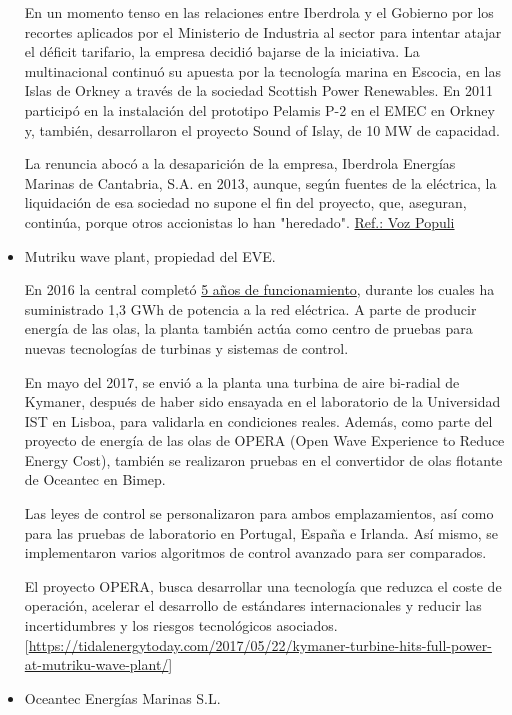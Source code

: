 \documentclass[]{article}
\begin{document}
\begin{itemize}
  En un momento tenso en las relaciones entre Iberdrola y el Gobierno
  por los recortes aplicados por el Ministerio de Industria al sector
  para intentar atajar el déficit tarifario, la empresa decidió bajarse
  de la iniciativa. La multinacional continuó su apuesta por la
  tecnología marina en Escocia, en las Islas de Orkney a través de la
  sociedad Scottish Power Renewables. En 2011 participó en la
  instalación del prototipo Pelamis P-2 en el EMEC en Orkney y, también,
  desarrollaron el proyecto Sound of Islay, de 10 MW de capacidad.

  La renuncia abocó a la desaparición de la empresa, Iberdrola Energías
  Marinas de Cantabria, S.A. en 2013, aunque, según fuentes de la
  eléctrica, la liquidación de esa sociedad no supone el fin del
  proyecto, que, aseguran, continúa, porque otros accionistas lo han
  "heredado".
  \href{https://www.vozpopuli.com/economia-y-finanzas/empresas/Iberdrola-Energia_marina-Cantabria_0_642535793.html}{Ref.:
  Voz Populi}
\item
  Mutriku wave plant, propiedad del EVE.

  En 2016 la central completó
  \href{https://tidalenergytoday.com/2016/07/19/mutriku-wave-plant-generates-over-1gwh-of-clean-power/}{5
  años de funcionamiento}, durante los cuales ha suministrado 1,3 GWh de
  potencia a la red eléctrica. A parte de producir energía de las olas,
  la planta también actúa como centro de pruebas para nuevas tecnologías
  de turbinas y sistemas de control.

  En mayo del 2017, se envió a la planta una turbina de aire bi-radial
  de Kymaner, después de haber sido ensayada en el laboratorio de la
  Universidad IST en Lisboa, para validarla en condiciones reales.
  Además, como parte del proyecto de energía de las olas de OPERA (Open
  Wave Experience to Reduce Energy Cost), también se realizaron pruebas
  en el convertidor de olas flotante de Oceantec en Bimep.

  Las leyes de control se personalizaron para ambos emplazamientos, así
  como para las pruebas de laboratorio en Portugal, España e Irlanda.
  Así mismo, se implementaron varios algoritmos de control avanzado para
  ser comparados.

  El proyecto OPERA, busca desarrollar una tecnología que reduzca el
  coste de operación, acelerar el desarrollo de estándares
  internacionales y reducir las incertidumbres y los riesgos
  tecnológicos asociados.
  {[}\url{https://tidalenergytoday.com/2017/05/22/kymaner-turbine-hits-full-power-at-mutriku-wave-plant/}{]}
\item
  Oceantec Energías Marinas S.L.


\end{itemize}
\end{document}
